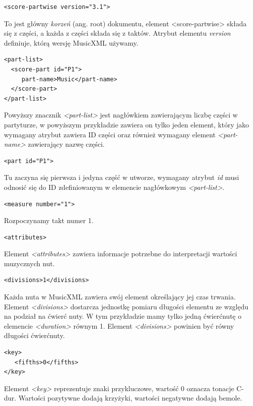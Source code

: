 \documentclass[printmode, eng, openany]{mgr}
\begin{document}
\begin{lstlisting}
<score-partwise version="3.1">
\end{lstlisting}
To jest główny \textit{korzeń} (ang. root) dokumentu, element <score-partwise> składa się z części, a każda z części składa się z taktów. Atrybut elementu \textit{version} definiuje, którą wersję MusicXML używamy.

\begin{lstlisting}
<part-list>
  <score-part id="P1">
     part-name>Music</part-name>
  </score-part>
</part-list>
\end{lstlisting}
Powyższy znacznik \textit{<part-list>} jest nagłówkiem zawierającym liczbę części w partyturze, w powyższym przykładzie zawiera on tylko jeden element, który jako wymagany atrybut zawiera ID części oraz również wymagany element \textit{<part-name>} zawierający nazwę części.


\begin{lstlisting}
<part id="P1">
\end{lstlisting}
Tu zaczyna się pierwsza i jedyna część w utworze, wymagany atrybut \textit{id} musi odnosić się do ID zdefiniowanym w elemencie nagłówkowym \textit{<part-list>}.

\begin{lstlisting}
<measure number="1">
\end{lstlisting}
Rozpoczynamy takt numer 1.

\begin{lstlisting}
<attributes>
\end{lstlisting}
Element \textit{<attributes>} zawiera informacje potrzebne do interpretacji wartości muzycznych nut.


\begin{lstlisting}
<divisions>1</divisions>
\end{lstlisting}
Każda nuta w MusicXML zawiera swój element określający jej czas trwania. Element \textit{<divisions>} dostarcza jednostkę pomiaru długości elementu  ze względu na podział na ćwierć nuty. W tym przykładzie mamy tylko jedną ćwierćnutę o elemencie \textit{<duration>} równym 1. Element \textit{<divisions>} powinien być równy długości ćwierćnuty.

\begin{lstlisting}
<key>
   <fifths>0</fifths>
</key>
\end{lstlisting}
Element \textit{<key>} reprezentuje znaki przykluczowe, wartość 0 oznacza tonacje C-dur. Wartości pozytywne dodają krzyżyki, wartości negatywne dodają bemole. 
\end{document}
